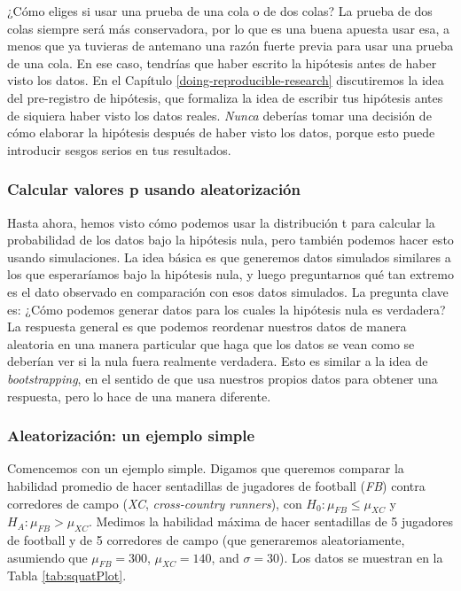 \documentclass[
  12pt,
]{book}
\begin{document}
¿Cómo eliges si usar una prueba de una cola o de dos colas? La prueba de dos colas siempre será más conservadora, por lo que es una buena apuesta usar esa, a menos que ya tuvieras de antemano una razón fuerte previa para usar una prueba de una cola. En ese caso, tendrías que haber escrito la hipótesis antes de haber visto los datos. En el Capítulo \ref{doing-reproducible-research} discutiremos la idea del pre-registro de hipótesis, que formaliza la idea de escribir tus hipótesis antes de siquiera haber visto los datos reales. \emph{Nunca} deberías tomar una decisión de cómo elaborar la hipótesis después de haber visto los datos, porque esto puede introducir sesgos serios en tus resultados.

\hypertarget{calcular-valores-p-usando-aleatorizaciuxf3n}{%
\subsubsection{Calcular valores p usando aleatorización}\label{calcular-valores-p-usando-aleatorizaciuxf3n}}

Hasta ahora, hemos visto cómo podemos usar la distribución t para calcular la probabilidad de los datos bajo la hipótesis nula, pero también podemos hacer esto usando simulaciones. La idea básica es que generemos datos simulados similares a los que esperaríamos bajo la hipótesis nula, y luego preguntarnos qué tan extremo es el dato observado en comparación con esos datos simulados. La pregunta clave es: ¿Cómo podemos generar datos para los cuales la hipótesis nula es verdadera? La respuesta general es que podemos reordenar nuestros datos de manera aleatoria en una manera particular que haga que los datos se vean como se deberían ver si la nula fuera realmente verdadera. Esto es similar a la idea de \emph{bootstrapping}, en el sentido de que usa nuestros propios datos para obtener una respuesta, pero lo hace de una manera diferente.

\hypertarget{aleatorizaciuxf3n-un-ejemplo-simple}{%
\subsubsection{Aleatorización: un ejemplo simple}\label{aleatorizaciuxf3n-un-ejemplo-simple}}

Comencemos con un ejemplo simple. Digamos que queremos comparar la habilidad promedio de hacer sentadillas de jugadores de football (\emph{FB}) contra corredores de campo (\emph{XC}, \emph{cross-country runners}), con \(H_0: \mu_{FB} \le \mu_{XC}\) y \(H_A: \mu_{FB} > \mu_{XC}\). Medimos la habilidad máxima de hacer sentadillas de 5 jugadores de football y de 5 corredores de campo (que generaremos aleatoriamente, asumiendo que \(\mu_{FB} = 300\), \(\mu_{XC} = 140\), and \(\sigma = 30\)). Los datos se muestran en la Tabla \ref{tab:squatPlot}.
\end{document}

